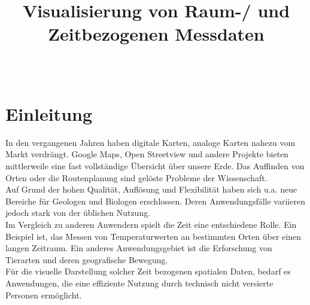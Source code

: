 \documentclass[10pt,conference,compsocconf]{IEEEtran}
\begin{document}
%
\title{\textbf{\Large Visualisierung von Raum-/ und Zeitbezogenen Messdaten}\\[0.2ex]}

\author{
\\
}

\maketitle

\IEEEpeerreviewmaketitle


\section{Einleitung}
In den vergangenen Jahren haben digitale Karten, analoge Karten nahezu vom Markt verdrängt. Google Maps, Open Streetview und andere Projekte bieten mittlerweile eine fast vollständige Übersicht über unsere Erde. Das Auffinden von Orten oder die Routenplanung sind gelöste Probleme der Wissenschaft.\\
Auf Grund der hohen Qualität, Auflösung und Flexibilität haben sich u.a. neue Bereiche für Geologen und Biologen erschlossen. Deren Anwendungsfälle variieren jedoch stark von der üblichen Nutzung.\\
Im Vergleich zu anderen Anwendern spielt die Zeit eine entschiedene Rolle. Ein Beispiel ist, das Messen von Temperaturwerten an bestimmten Orten über einen langen Zeitraum. Ein anderes Anwendungsgebiet ist die Erforschung von Tierarten und deren geografische Bewegung.\\
Für die visuelle Darstellung solcher Zeit bezogenen spatialen Daten, bedarf es Anwendungen, die eine effiziente Nutzung durch technisch nicht versierte Personen ermöglicht.
\end{document}

